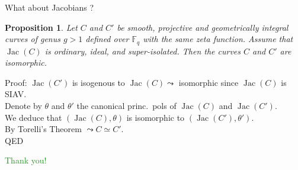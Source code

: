 \documentclass[usenames,dvipsnames,handout]{beamer}
\def\F{\mathbb{F}}
\DeclareMathOperator{\Jac}{Jac}
\newcommand{\green}[1]{\textcolor{ForestGreen}{#1}}
\newtheorem{proposition}[df]{Proposition}
\begin{document}
\begin{frame}{ What about Jacobians ? }    
    \begin{proposition}
	Let $C$ and $C'$ be smooth, projective and geometrically integral curves of genus $g>1$ defined over $\F_q$ with the same zeta function.
	Assume that $\Jac(C)$ is ordinary, ideal, and super-isolated.
	Then the curves $C$ and $C'$ are isomorphic.
	\end{proposition}
	\pause Proof:
	$\Jac(C')$ is isogenous to $\Jac(C) \leadsto$ isomorphic since $\Jac(C)$ is SIAV.\\
	Denote by $\theta$ and $\theta'$ the canonical princ.~pols of $\Jac(C)$ and $\Jac(C')$.\\
	\pause We deduce that $(\Jac(C),\theta)$ is isomorphic to $(\Jac(C'),\theta')$.\\
	\pause By Torelli's Theorem $\leadsto C\simeq C'$.\\
	QED
\end{frame}

\begin{frame}{ }
\begin{center}
\green{\huge Thank you!}
\end{center}
\end{frame}
\end{document}
